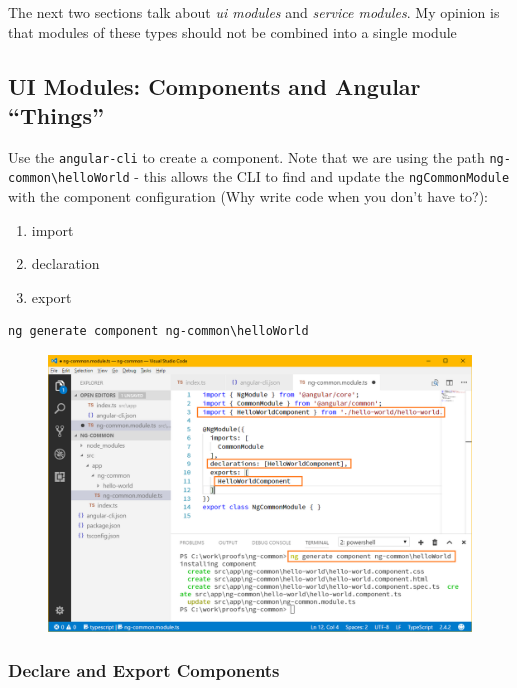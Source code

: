 \documentclass[]{book}
\providecommand{\tightlist}{%
  \setlength{\itemsep}{0pt}\setlength{\parskip}{0pt}}
\theoremstyle{definition}
\theoremstyle{definition}
\theoremstyle{definition}
\theoremstyle{remark}
\begin{document}
The next two sections talk about \emph{ui modules} and \emph{service
modules}. My opinion is that modules of these types should not be
combined into a single module

\hypertarget{ui-modules}{\subsection{\texorpdfstring{UI Modules:
Components and Angular
``Things''}{UI Modules: Components and Angular Things}}\label{ui-modules}}

Use the \texttt{angular-cli} to create a component. Note that we are
using the path \texttt{ng-common\textbackslash{}helloWorld} - this
allows the CLI to find and update the \texttt{ngCommonModule} with the
component configuration (Why write code when you don't have to?):

\begin{enumerate}
\def\labelenumi{\arabic{enumi}.}
\tightlist
\item
  import
\item
  declaration
\item
  export
\end{enumerate}

\begin{verbatim}
ng generate component ng-common\helloWorld
\end{verbatim}

\begin{figure}
\centering
\includegraphics{images/ng-generate-component.png}
\caption{}
\end{figure}

\subsubsection{Declare and Export
Components}\label{declare-and-export-components}
\end{document}

